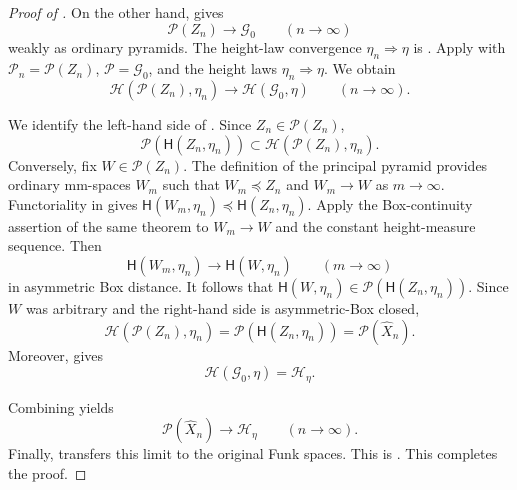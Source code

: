 \documentclass{amsart}
\numberwithin{equation}{section}
\theoremstyle{plain}
\theoremstyle{definition}
\theoremstyle{remark}
\newcommand{\Pyr}{\mathcal P}
\begin{document}
\begin{proof}[Proof of ]
On the other hand, \cite[Theorem~1.1(3)]{shioya2017spheres} gives
\begin{equation}\label{eq:joint-spherical-pyramid-limit}
 \Pyr(Z_n)\longrightarrow\mathcal G_0
 \qquad(n\to\infty)
\end{equation}
weakly as ordinary pyramids.  The height-law convergence $\eta_n\Rightarrow\eta$ is
.  Apply
 with
$\mathcal P_n=\Pyr(Z_n)$, $\mathcal P=\mathcal G_0$, and the height laws $\eta_n\Rightarrow\eta$.  We obtain
\begin{equation}\label{eq:joint-comparison-pyramid-limit}
 \mathcal H(\Pyr(Z_n),\eta_n)
 \longrightarrow
 \mathcal H(\mathcal G_0,\eta)
 \qquad(n\to\infty).
\end{equation}

We identify the left-hand side of .  Since $Z_n\in\Pyr(Z_n)$,
\[
 \Pyr(\mathsf H(Z_n,\eta_n))
 \subset\mathcal H(\Pyr(Z_n),\eta_n).
\]
Conversely, fix $W\in\Pyr(Z_n)$.  The definition of the principal pyramid provides ordinary mm-spaces $W_m$ such that
$W_m\preceq Z_n$ and $W_m\to W$ as $m\to\infty$.  Functoriality in  gives
$\mathsf H(W_m,\eta_n)\preceq\mathsf H(Z_n,\eta_n)$.  Apply the Box-continuity assertion of the same theorem to
$W_m\to W$ and the constant height-measure sequence.  Then
\[
 \mathsf H(W_m,\eta_n)\longrightarrow\mathsf H(W,\eta_n)
 \qquad(m\to\infty)
\]
in asymmetric Box distance.  It follows that
$\mathsf H(W,\eta_n)\in\Pyr(\mathsf H(Z_n,\eta_n))$.  Since $W$ was arbitrary and the right-hand side is
asymmetric-Box closed,
\begin{equation}\label{eq:principal-base-horocone-identity}
 \mathcal H(\Pyr(Z_n),\eta_n)
 =\Pyr(\mathsf H(Z_n,\eta_n))
 =\Pyr(\widehat X_n).
\end{equation}
Moreover,  gives
\begin{equation}\label{eq:joint-radial-target-identity}
 \mathcal H(\mathcal G_0,\eta)=\mathcal H_\eta.
\end{equation}

Combining
 yields
\[
 \Pyr(\widehat X_n)\longrightarrow\mathcal H_\eta
 \qquad(n\to\infty).
\]
Finally,  transfers this limit to the original Funk spaces.  This is
.  This completes the proof.
\end{proof}
\end{document}

